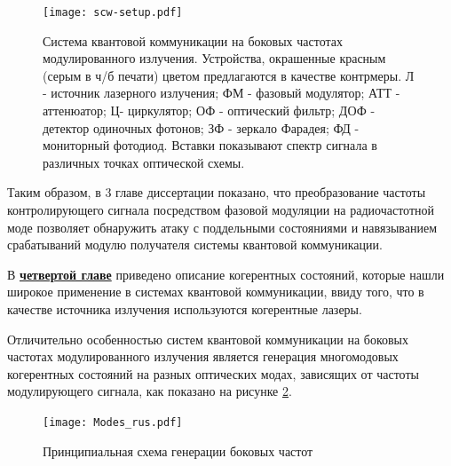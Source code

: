 \begin{figure}
	\centering \texttt{[image: scw-setup.pdf]}
	\caption{Система квантовой коммуникации на боковых частотах модулированного излучения. Устройства, окрашенные красным (серым в ч/б печати) цветом предлагаются в качестве контрмеры. Л - источник лазерного излучения; ФМ - фазовый модулятор; АТТ - аттенюатор; Ц- циркулятор; ОФ - оптический фильтр; ДОФ - детектор одиночных фотонов; ЗФ - зеркало Фарадея; ФД - мониторный фотодиод. Вставки показывают спектр сигнала в различных точках оптической схемы.}
	\label{fig:scw-setup_ref}
\end{figure}


Таким образом, в 3 главе диссертации показано, что преобразование частоты контролирующего сигнала посредством фазовой модуляции на радиочастотной моде позволяет обнаружить атаку с поддельными состояниями и навязыванием срабатываний модулю получателя системы квантовой коммуникации.


 В \underline{\textbf{четвертой главе}} приведено описание когерентных состояний, которые нашли широкое применение в системах квантовой коммуникации, ввиду того, что в качестве источника излучения используются когерентные лазеры. 
 
 Отличительно особенностью систем квантовой коммуникации на боковых частотах модулированного излучения является генерация многомодовых когерентных состояний на разных оптических модах, зависящих от частоты модулирующего сигнала, как показано на рисунке \ref{fig:multimodes}. 

 \begin{figure}[ht]
  \centering
  \texttt{[image: Modes\_rus.pdf]}
  \caption{Принципиальная схема генерации боковых частот}
  \label{fig:multimodes}
\end{figure}


